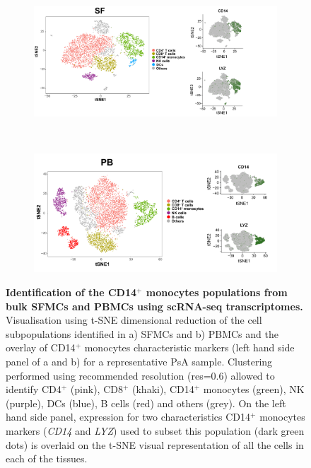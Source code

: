 \bigskip
\begin{figure}[htbp]
\centering
\begin{subfigure}[b]{0.70\textwidth}
\centering 
\includegraphics[width=\textwidth]{./Appendix/pdfs/Chapter5/PSA_SF_clusters_and_monocytes_markers}
\caption{}
\end{subfigure}
~
\begin{subfigure}[b]{0.70\textwidth} 
\centering
\includegraphics[width=\textwidth]{./Appendix/pdfs/Chapter5/PSA_PB_clusters_and_monocytes_markers}
\caption{}
\end{subfigure}
\caption[Identification of the CD14$^+$ monocytes populations from bulk SFMCs and PBMCs using scRNA-seq transcriptomes.]{\textbf{Identification of the CD14$^+$ monocytes populations from bulk SFMCs and PBMCs using scRNA-seq transcriptomes.} Visualisation using t-SNE dimensional reduction of the cell subpopulations identified in a) SFMCs and b) PBMCs and the overlay of CD14$^+$ monocytes characteristic markers (left hand side panel of a and b) for a representative PsA sample. Clustering performed using recommended resolution (res=0.6) allowed to identify CD4$^+$ (pink), CD8$^+$ (khaki), CD14$^+$ monocytes (green), NK (purple), DCs (blue), B cells (red) and others (grey). On the left hand side panel, expression for two characteristics CD14$^+$ monocytes markers (\textit{CD14} and \textit{LYZ}) used to subset this population (dark green dots) is overlaid on the t-SNE visual representation of all the cells in each of the tissues.}
\label{figure:PsA_scRNAseq_SF_an_PB_monocytes_identification_from_bulk}
\end{figure}




